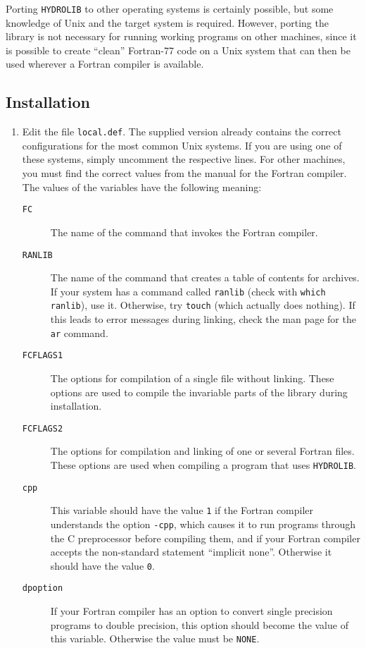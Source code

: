 \documentclass[12pt]{article}
\newcommand{\prog}[1]{{\tt #1}}
\begin{document}
Porting \prog{HYDROLIB} to other operating systems is certainly
possible, but some knowledge of Unix and the target system is
required. However, porting the library is not necessary for running
working programs on other machines, since it is possible to create
``clean'' Fortran-77 code on a Unix system that can then be used
wherever a Fortran compiler is available.


\subsection{Installation}

\begin{enumerate}

\item
Edit the file \prog{local.def}. The supplied version already contains
the correct configurations for the most common Unix systems. If you are
using one of these systems, simply uncomment the respective lines. For
other machines, you must find the correct values from the manual for
the Fortran compiler. The values of the variables have the following
meaning:
\begin{description}
\item[\prog{FC}] The name of the command that invokes the Fortran compiler.
\item[\prog{RANLIB}] The name of the command that creates a table of
contents for archives. If your system has a command called \prog{ranlib} (check
with \prog{which ranlib}), use it. Otherwise, try \prog{touch} (which actually
does nothing). If this leads to error messages during linking, check the
man page for the \prog{ar} command.
\item[\prog{FCFLAGS1}] The options for compilation of a single file without
linking. These options are used to compile the invariable parts of the
library during installation.
\item[\prog{FCFLAGS2}] The options for compilation and linking of one
or several Fortran files. These options are used when compiling
a program that uses \prog{HYDROLIB}.
\item[\prog{cpp}] This variable should have the value \prog{1} if
the Fortran compiler understands the option \prog{-cpp}, which
causes it to run programs through the C preprocessor before compiling
them, and if your Fortran compiler accepts the non-standard statement
``implicit none''. Otherwise it should have the value \prog{0}.
\item[\prog{dpoption}] If your Fortran compiler has an option to
convert single precision programs to double precision, this option
should become the value of this variable. Otherwise the value must
be \prog{NONE}.
\end{description}


\end{enumerate}
\end{document}
